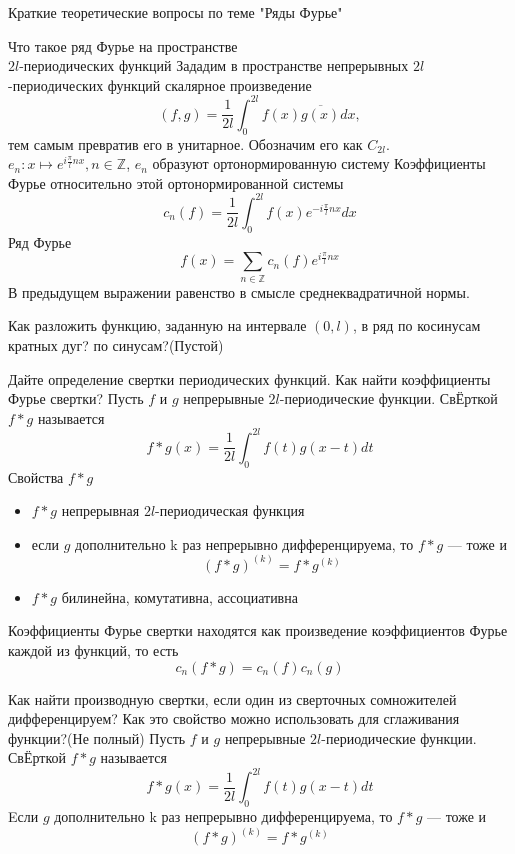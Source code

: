 \documentclass{article}
\begin{document}
\begin{section}{Краткие теоретические вопросы по теме "Ряды Фурье"}
\begin{subsection}{Что такое ряд Фурье на пространстве\\$2l$-периодических функций}
Зададим в пространстве непрерывных $2l$-периодических функций скалярное произведение
\[(f, g) = \frac{1}{2l}\int_0^{2l}f(x)\overline{g(x)}dx,\]
тем самым превратив его в унитарное. Обозначим его как $C_{2l}$.\\

$e_n: x \mapsto e^{i\frac{\pi}{l}nx}, n \in \mathbb{Z}$, $e_n$ образуют ортонормированную систему
Коэффициенты Фурье относительно этой ортонормированной системы
\[c_n(f) = \frac{1}{2l} \int_0^{2l}f(x)e^{-i\frac{\pi}{l}nx}dx\]
Ряд Фурье 
\[f(x) = \sum_{n \in \mathbb{Z}} c_n(f)e^{i\frac{\pi}{l}nx}\]
В предыдущем выражении равенство в смысле среднеквадратичной нормы.
\end{subsection}


\begin{subsection}{Как разложить функцию, заданную на интервале $(0, l)$, в ряд по косинусам кратных дуг? по синусам?(Пустой)}
\end{subsection}


\begin{subsection}{Дайте определение свертки периодических функций. Как найти коэффициенты Фурье свертки?}
Пусть $f$ и $g$ непрерывные $2l$-периодические функции. СвЁрткой $f*g$ называется 
\[f*g(x) = \frac{1}{2l}\int_0^{2l}f(t)g(x-t)dt\]
Свойства $f*g$
\begin{itemize}
	\item
	$f*g$ непрерывная $2l$-периодическая функция
	\item
	если $g$ дополнительно k раз непрерывно дифференцируема, то $f*g$ --- тоже и 
	\[(f*g)^{(k)} = f*g^{(k)}\]
	\item
	$f*g$ билинейна, комутативна, ассоциативна
\end{itemize}

Коэффициенты Фурье свертки находятся как произведение коэффициентов Фурье каждой из функций, то есть
\[c_n(f*g)=c_n(f)c_n(g)\]
\end{subsection}


\begin{subsection}{Как найти производную свертки, если один из сверточных сомножителей дифференцируем? Как это свойство можно использовать для сглаживания функции?(Не полный)}
Пусть $f$ и $g$ непрерывные $2l$-периодические функции. СвЁрткой $f*g$ называется 
\[f*g(x) = \frac{1}{2l}\int_0^{2l}f(t)g(x-t)dt\]
Eсли $g$ дополнительно k раз непрерывно дифференцируема, то $f*g$ --- тоже и 
\[(f*g)^{(k)} = f*g^{(k)}\]
\end{subsection}



\end{section}
\end{document}
